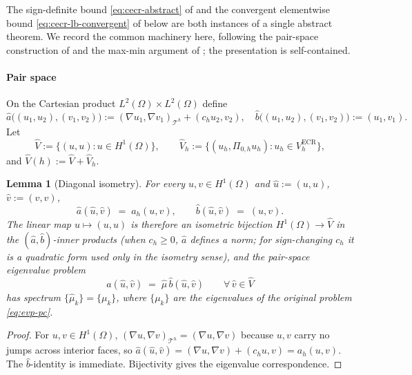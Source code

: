 \documentclass[11pt]{article}
\theoremstyle{plain}
\newtheorem{lemma}{Lemma}
\theoremstyle{definition}
\theoremstyle{remark}
\newcommand{\ECR}{\mathrm{ECR}}
\begin{document}
\smallskip
The sign-definite bound \eqref{eq:cecr-abstract} of
 and the convergent elementwise bound
\eqref{eq:cecr-lb-convergent} of  below are
both instances of a single abstract theorem. We record the common
machinery here, following the pair-space construction of
\cite[\S4.1.3]{liu2024guaranteed} and the max-min argument of
\cite[\S3.1]{liu2024guaranteed}; the presentation is self-contained.

\paragraph{Pair space}
On the Cartesian product $L^2(\Omega)\times L^2(\Omega)$ define
\begin{equation}
\label{eq:pair-forms}
  \widehat a\bigl((u_1,u_2),(v_1,v_2)\bigr)
    := (\nabla u_1,\nabla v_1)_{\mathcal{T}^h}+(c_h u_2,v_2),
  \quad
  \widehat b\bigl((u_1,u_2),(v_1,v_2)\bigr)
    := (u_1,v_1).
\end{equation}
Let
\begin{equation}
\label{eq:pair-spaces}
  \widehat V   := \{(u,u):u\in H^1(\Omega)\},\qquad
  \widehat V_h := \{(u_h,\Pi_{0,h}u_h):u_h\in V_h^{\ECR}\},
\end{equation}
and $\widehat V(h):=\widehat V+\widehat V_h$.

\begin{lemma}[Diagonal isometry]
\label{lem:diag-isometry}
For every $u,v\in H^1(\Omega)$ and $\widehat u:=(u,u)$,
$\widehat v:=(v,v)$,
\begin{equation}
\label{eq:diag-iso}
  \widehat a(\widehat u,\widehat v) \;=\; a_h(u,v),
  \qquad
  \widehat b(\widehat u,\widehat v) \;=\; (u,v).
\end{equation}
The linear map $u\mapsto(u,u)$ is therefore an isometric bijection
$H^1(\Omega)\to\widehat V$ in the $(\widehat a,\widehat b)$-inner products
(when $c_h\ge 0$, $\widehat a$ defines a norm; for sign-changing $c_h$
it is a quadratic form used only in the isometry sense),
and the pair-space eigenvalue problem
\begin{equation}
\label{eq:pair-evp}
  \widehat a(\widehat u,\widehat v)
  \;=\; \widehat\mu\,\widehat b(\widehat u,\widehat v)
  \qquad \forall\,\widehat v\in\widehat V
\end{equation}
has spectrum $\{\widehat\mu_k\}=\{\mu_k\}$, where $\{\mu_k\}$ are
the eigenvalues of the original problem \eqref{eq:evp-pc}.
\end{lemma}

\begin{proof}
For $u,v\in H^1(\Omega)$, $(\nabla u,\nabla v)_{\mathcal{T}^h}
=(\nabla u,\nabla v)$ because $u,v$ carry no jumps across interior
faces, so $\widehat a(\widehat u,\widehat v)
=(\nabla u,\nabla v)+(c_h u,v)=a_h(u,v)$. The $\widehat b$-identity
is immediate. Bijectivity gives the eigenvalue correspondence.
\end{proof}
\end{document}
